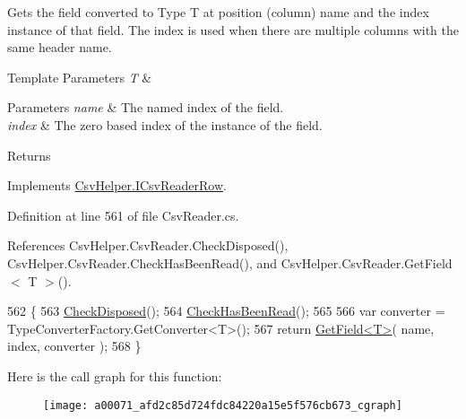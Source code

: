 Gets the field converted to Type T at position (column) name and the index instance of that field. The index is used when there are multiple columns with the same header name. 


\begin{DoxyTemplParams}{Template Parameters}
{\em T} & \\
\hline
\end{DoxyTemplParams}

\begin{DoxyParams}{Parameters}
{\em name} & The named index of the field.\\
\hline
{\em index} & The zero based index of the instance of the field.\\
\hline
\end{DoxyParams}
\begin{DoxyReturn}{Returns}

\end{DoxyReturn}


Implements \hyperlink{a00109_aa8c349da18823eb8c30911d891b3e3bc}{Csv\-Helper.\-I\-Csv\-Reader\-Row}.



Definition at line 561 of file Csv\-Reader.\-cs.



References Csv\-Helper.\-Csv\-Reader.\-Check\-Disposed(), Csv\-Helper.\-Csv\-Reader.\-Check\-Has\-Been\-Read(), and Csv\-Helper.\-Csv\-Reader.\-Get\-Field$<$ T $>$().


\begin{DoxyCode}
562         \{
563             \hyperlink{a00071_a6fa45a46ed1322dc1872ca2321b5edbc}{CheckDisposed}();
564             \hyperlink{a00071_a2d9249171ed1568e45d152766d364c31}{CheckHasBeenRead}();
565 
566             var converter = TypeConverterFactory.GetConverter<T>();
567             \textcolor{keywordflow}{return} \hyperlink{a00071_a6a43cfaf39caea93ecd87e506be7b404}{GetField<T>}( name, index, converter );
568         \}
\end{DoxyCode}


Here is the call graph for this function\-:
\nopagebreak
\begin{figure}[H]
\begin{center}
\leavevmode
\texttt{[image: a00071\_afd2c85d724fdc84220a15e5f576cb673\_cgraph]}
\end{center}
\end{figure}


